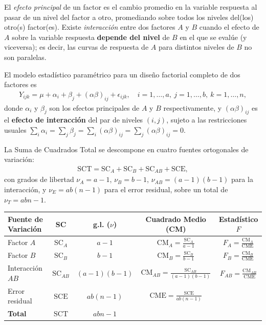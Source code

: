 \begin{definicion}
	El \emph{efecto principal} de un factor es el cambio promedio en la variable respuesta al pasar de un nivel del factor a otro, promediando sobre todos los niveles del(los) otro(s) factor(es). Existe \emph{interacción} entre dos factores $A$ y $B$ cuando el efecto de $A$ sobre la variable respuesta \textbf{depende del nivel} de $B$ en el que se evalúe (y viceversa); es decir, las curvas de respuesta de $A$ para distintos niveles de $B$ no son paralelas.
\end{definicion}

El modelo estadístico paramétrico para un diseño factorial completo de dos factores es
\begin{align}
	Y_{ijk} = \mu + \alpha_i + \beta_j + (\alpha\beta)_{ij} + \epsilon_{ijk}, \quad i=1,\ldots,a,\ j=1,\ldots,b,\ k=1,\ldots,n,
	\label{eq:modelo_factorial}
\end{align}
donde $\alpha_i$ y $\beta_j$ son los efectos principales de $A$ y $B$ respectivamente, y $(\alpha\beta)_{ij}$ es el \textbf{efecto de interacción} del par de niveles $(i,j)$, sujeto a las restricciones usuales $\sum_i \alpha_i = \sum_j \beta_j = \sum_i (\alpha\beta)_{ij} = \sum_j (\alpha\beta)_{ij} = 0$.

\begin{teorema}
	La Suma de Cuadrados Total se descompone en cuatro fuentes ortogonales de variación:
	\begin{align}
		\text{SCT} = \text{SC}_A + \text{SC}_B + \text{SC}_{AB} + \text{SCE},
	\end{align}
	con grados de libertad $\nu_A = a-1$, $\nu_B = b-1$, $\nu_{AB} = (a-1)(b-1)$ para la interacción, y $\nu_E = ab(n-1)$ para el error residual, sobre un total de $\nu_T = abn - 1$.
\end{teorema}

\begin{center}
	\begin{tabular}{lcccc}
		\hline
		\textbf{Fuente de Variación} & \textbf{SC} & \textbf{g.l. ($\nu$)} & \textbf{Cuadrado Medio (CM)} & \textbf{Estadístico $F$} \\ \hline
		Factor $A$ & $\text{SC}_A$ & $a-1$ & $\text{CM}_A = \frac{\text{SC}_A}{a-1}$ & $F_A = \frac{\text{CM}_A}{\text{CME}}$ \\ [1ex]
		Factor $B$ & $\text{SC}_B$ & $b-1$ & $\text{CM}_B = \frac{\text{SC}_B}{b-1}$ & $F_B = \frac{\text{CM}_B}{\text{CME}}$ \\ [1ex]
		Interacción $AB$ & $\text{SC}_{AB}$ & $(a-1)(b-1)$ & $\text{CM}_{AB} = \frac{\text{SC}_{AB}}{(a-1)(b-1)}$ & $F_{AB} = \frac{\text{CM}_{AB}}{\text{CME}}$ \\ [1ex]
		Error residual & $\text{SCE}$ & $ab(n-1)$ & $\text{CME} = \frac{\text{SCE}}{ab(n-1)}$ & \\ [1ex] \hline
		\textbf{Total} & $\text{SCT}$ & $abn-1$ & & \\ \hline
	\end{tabular}
\end{center}

